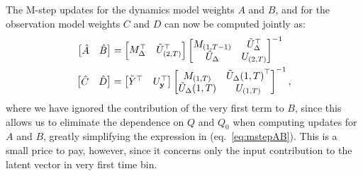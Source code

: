 \documentclass[10pt]{article}
\newcommand{\vy}{\mathbf{y}}
\begin{document}
\begin{appendices}
The M-step updates for the dynamics model weights $A$ and $B$, and for
the observation model weights $C$ and $D$ can now
be computed jointly as:
\begin{align}
  \label{eq:mstepAB} 
  \begin{bmatrix}
    \hat A & \hat B
  \end{bmatrix} &=
                                      \begin{bmatrix}
                                        M_\Delta\trp &
                                        \tilde U_{(2,T)}\trp
                                      \end{bmatrix}
                  \begin{bmatrix}
                    M_{(1,T-1)} & \tilde U_\Delta\trp \\
                    \tilde U_\Delta & U_{(2,T)}
                  \end{bmatrix}\inv
  \\
  \begin{bmatrix}
    \hat C & \hat D
  \end{bmatrix} &=
                  \begin{bmatrix}
                    \tilde Y\trp &
                    U_{\vy}\trp
                  \end{bmatrix}
                  \begin{bmatrix}
                    M_{(1,T)} & \tilde U_\Delta{(1,T)}\trp \\
                    \tilde U_\Delta{(1,T)} & U_{(1,T)}
                  \end{bmatrix}\inv,
\end{align}
where we have ignored the contribution of the very first term to $B$,
since this allows us to eliminate the dependence on $Q$ and $Q_0$ when
computing updates for $A$ and $B$, greatly simplifying the expression
in (eq.~\ref{eq:mstepAB}). This is a small price to pay, however,
since it concerns only the input contribution to the latent vector in
very first time bin.



\end{appendices}
\end{document}
